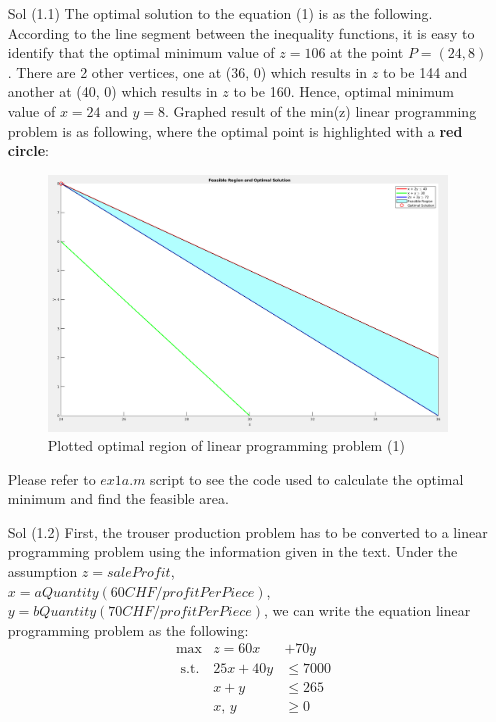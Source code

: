 \documentclass[unicode,11pt,a4paper,oneside,numbers=endperiod,openany]{scrartcl}
\begin{document}
\vspace{20px}

\begin{enumerate}
 \item[Sol (1.1)] The optimal solution to the equation (1) is as the following. According to the line segment between the inequality functions, it is easy to identify that the optimal minimum value of ${z = 106}$ at the point ${P=(24,8)}$. There are 2 other vertices, one at (36, 0) which results in ${z}$ to be 144 and another at (40, 0) which results in ${z}$ to be 160. Hence, optimal minimum value of ${x = 24}$ and ${y = 8}$. Graphed result of the min(z) linear programming problem is as following, where the optimal point is highlighted with a \textbf{red circle}: \\
\begin{figure}[h!]
    \begin{minipage}[c]{1\linewidth}
        \centering
        \includegraphics[width=0.9\linewidth]{./figure1.png}
    \end{minipage}
    \caption{Plotted optimal region of linear programming problem (1)}
\end{figure}

Please refer to ${ex1a.m}$ script to see the code used to calculate the optimal minimum and find the feasible area. \\

\item[Sol (1.2)] First, the trouser production problem has to be converted to a linear programming problem using the information given in the text. Under the assumption ${z = saleProfit}$, \\ ${x = aQuantity(60CHF/profitPerPiece)}$, ${y = bQuantity(70CHF/profitPerPiece)}$, we can write the equation linear programming problem as the following: \\

\begin{equation*}
		\begin{aligned}
		& \text{max}  &  z=60x&+70y\\
		& \text{ s.t.} &  25x+40y &\leq 7000 \\
		& &   x+y &\leq 265\\
		& &  x,\,y &\geq0 \\
		\end{aligned}
		\end{equation*}
\end{enumerate}
\end{document}
